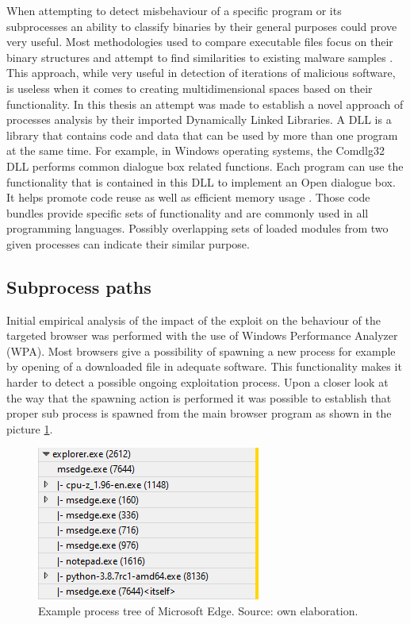 \documentclass[a4paper,twoside,12pt]{book}
\begin{document}
When attempting to detect misbehaviour of a specific program or its subprocesses an ability to 
classify binaries by their general purposes could prove very useful. Most methodologies used to 
compare executable files focus on their binary structures and attempt to find similarities to 
existing malware samples \cite{bib:malwclass}. This approach, while very useful in detection of 
iterations of malicious software, is useless when it comes to creating multidimensional spaces 
based on their functionality. In this thesis an attempt was made to establish a novel approach of 
processes analysis by their imported Dynamically Linked Libraries. A DLL is a library that 
contains code and data that can be used by more than one program at the same time. For example, 
in Windows operating systems, the Comdlg32 DLL performs common dialogue box related functions. Each 
program can use the functionality that is contained in this DLL to implement an Open dialogue box. 
It helps promote code reuse as well as efficient memory usage \cite{bib:dll}. Those code bundles provide 
specific sets of functionality and are commonly used in all programming languages. Possibly 
overlapping sets of loaded modules from two given processes can indicate their similar purpose. 

\subsection{Subprocess paths}

Initial empirical analysis of the impact of the exploit on the behaviour of the targeted browser was 
performed with the use of Windows Performance Analyzer (WPA).  Most browsers give a 
possibility of spawning a new process for example by opening of a downloaded file in 
adequate software. This functionality makes it harder to detect a possible ongoing exploitation process. 
Upon a closer look at the way that the spawning action is performed it was possible to establish that proper 
sub process is spawned from the main browser program as shown in the picture \ref{fig:WPAnormal}.

\begin{figure}
	\centering
	\includegraphics{images/wpa_normal}
	\caption{Example process tree of Microsoft Edge. Source: own elaboration.}
	\label{fig:WPAnormal}
 \end{figure}
\end{document}
